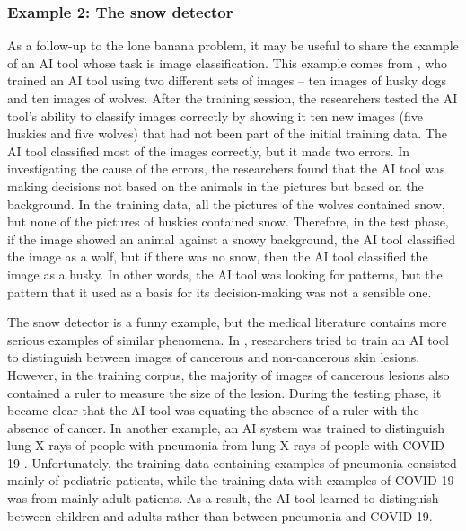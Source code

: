 \documentclass[output=paper]{langscibook}
\begin{document}
\subsubsection{Example 2: The snow detector}\label{sec:4:4.3.3}
As a follow-up to the lone banana problem, it may be useful to share the example of an AI tool whose task is image classification. This example comes from \citet{ribeiroetal16}, who trained an AI tool using two different sets of images – ten images of husky dogs and ten images of wolves. After the training session, the researchers tested the AI tool’s ability to classify images correctly by showing it ten new images (five huskies and five wolves) that had not been part of the initial training data. The AI tool classified most of the images correctly, but it made two errors. In investigating the cause of the errors, the researchers found that the AI tool was making decisions not based on the animals in the pictures but based on the background. In the training data, all the pictures of the wolves contained snow, but none of the pictures of huskies contained snow. Therefore, in the test phase, if the image showed an animal against a snowy background, the AI tool classified the image as a wolf, but if there was no snow, then the AI tool classified the image as a husky. In other words, the AI tool was looking for patterns, but the pattern that it used as a basis for its decision-making was not a sensible one.

The snow detector is a funny example, but the medical literature contains more serious examples of similar phenomena. In \citet{narlaetal18}, researchers tried to train an AI tool to distinguish between images of cancerous and non-cancerous skin lesions. However, in the training corpus, the majority of images of cancerous lesions also contained a ruler to measure the size of the lesion. During the testing phase, it became clear that the AI tool was equating the absence of a ruler with the absence of cancer. In another example, an AI system was trained to distinguish lung X-rays of people with pneumonia from lung X-rays of people with COVID-19 \citep{robertsetal21}. Unfortunately, the training data containing examples of pneumonia consisted mainly of pediatric patients, while the training data with examples of COVID-19 was from mainly adult patients. As a result, the AI tool learned to distinguish between children and adults rather than between pneumonia and COVID-19.
\end{document}
